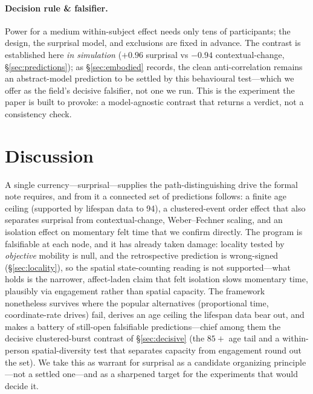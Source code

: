 \documentclass[11pt]{article}
\begin{document}
\paragraph{Decision rule \& falsifier.}
\begin{center}
\end{center}
Power for a medium within-subject effect needs only tens of participants; the design, the
surprisal model, and exclusions are fixed in advance. The contrast is established here
\emph{in simulation} ($+0.96$ surprisal vs $-0.94$ contextual-change, \S\ref{sec:predictions});
as \S\ref{sec:embodied} records, the clean anti-correlation remains an abstract-model
prediction to be settled by this behavioural test---which we offer as the field's decisive
falsifier, not one we run. This is the experiment the paper is built to provoke: a
model-agnostic contrast that returns a verdict, not a consistency check.

\section{Discussion}
A single currency---surprisal---supplies the path-distinguishing drive the formal note
requires, and from it a connected set of predictions follows: a finite age ceiling
(supported by lifespan data to 94), a clustered-event order effect that also separates
surprisal from contextual-change, Weber--Fechner scaling, and an isolation effect on
momentary felt time that we confirm directly. The program is falsifiable at each node,
and it has already taken damage: locality tested by \emph{objective} mobility is null,
and the retrospective prediction is wrong-signed (\S\ref{sec:locality}), so the spatial
state-counting reading is not supported---what holds is the narrower, affect-laden claim
that felt isolation slows momentary time, plausibly via engagement rather than spatial
capacity. The framework nonetheless survives where the popular alternatives (proportional
time, coordinate-rate drives) fail, derives an age ceiling the lifespan data bear out, and
makes a battery of still-open falsifiable predictions---chief among them the decisive
clustered-burst contrast of \S\ref{sec:decisive} (the $85+$ age tail and a within-person
spatial-diversity test that separates capacity from engagement round out the set). We take
this as warrant for surprisal as a candidate organizing principle---not a settled one---and
as a sharpened target for the experiments
that would decide it.
\end{document}
